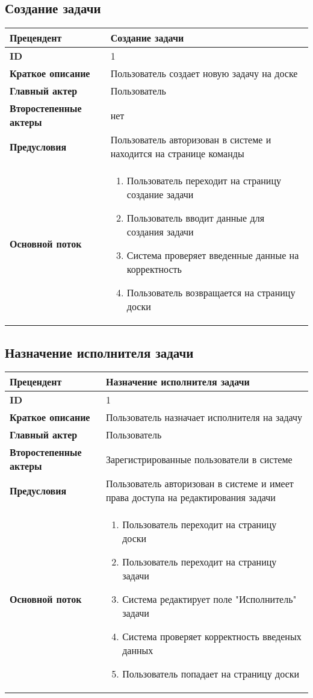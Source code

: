 \documentclass{article}
\begin{document}
\subsection{Создание задачи}

\begin{tabular}{|l|p{9cm}|}
  \hline
  \textbf{Прецендент} & Создание задачи \\
  \hline
  \textbf{ID} & 1 \\
  \hline
  \textbf{Краткое описание} & Пользователь создает новую задачу на доске \\
  \hline
  \textbf{Главный актер} & Пользователь\\
  \hline
  \textbf{Второстепенные актеры} & нет \\
  \hline
  \textbf{Предусловия} &  Пользователь авторизован в системе и находится на странице команды\\
  \hline
  \textbf{Основной поток} & \begin{enumerate}
    \item Пользователь переходит на страницу создание задачи
    \item Пользователь вводит данные для создания задачи
    \item Система проверяет введенные данные на корректность
    \item Пользователь возвращается на страницу доски
  \end{enumerate} \\
  \hline
\end{tabular} 

\subsection{Назначение исполнителя задачи}

\begin{tabular}{|l|p{9cm}|}
  \hline
  \textbf{Прецендент} & Назначение исполнителя задачи \\
  \hline
  \textbf{ID} & 1 \\
  \hline
  \textbf{Краткое описание} & Пользователь назначает исполнителя на задачу \\
  \hline
  \textbf{Главный актер} & Пользователь\\
  \hline
  \textbf{Второстепенные актеры} & Зарегистрированные пользователи в системе \\
  \hline
  \textbf{Предусловия} &  Пользователь авторизован в системе и имеет права доступа на редактирования задачи\\
  \hline
  \textbf{Основной поток} & \begin{enumerate}
    \item Пользователь переходит на страницу доски
    \item Пользователь переходит на страницу задачи
    \item Система редактирует поле "Исполнитель" задачи
    \item Система проверяет корректность введеных данных
    \item Пользователь попадает на страницу доски
  \end{enumerate} \\
  \hline
\end{tabular}
\end{document}
